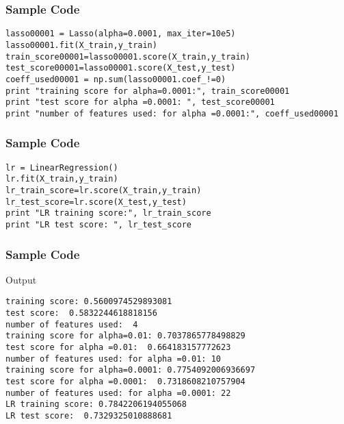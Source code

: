 \begin{frame}[fragile]\frametitle{Sample Code}

\begin{lstlisting}
lasso00001 = Lasso(alpha=0.0001, max_iter=10e5)
lasso00001.fit(X_train,y_train)
train_score00001=lasso00001.score(X_train,y_train)
test_score00001=lasso00001.score(X_test,y_test)
coeff_used00001 = np.sum(lasso00001.coef_!=0)
print "training score for alpha=0.0001:", train_score00001 
print "test score for alpha =0.0001: ", test_score00001
print "number of features used: for alpha =0.0001:", coeff_used00001
\end{lstlisting}

\end{frame}

\begin{frame}[fragile]\frametitle{Sample Code}

\begin{lstlisting}
lr = LinearRegression()
lr.fit(X_train,y_train)
lr_train_score=lr.score(X_train,y_train)
lr_test_score=lr.score(X_test,y_test)
print "LR training score:", lr_train_score 
print "LR test score: ", lr_test_score
\end{lstlisting}

\end{frame}


\begin{frame}[fragile]\frametitle{Sample Code}
Output

\begin{lstlisting}
training score: 0.5600974529893081
test score:  0.5832244618818156
number of features used:  4
training score for alpha=0.01: 0.7037865778498829
test score for alpha =0.01:  0.664183157772623
number of features used: for alpha =0.01: 10
training score for alpha=0.0001: 0.7754092006936697
test score for alpha =0.0001:  0.7318608210757904
number of features used: for alpha =0.0001: 22
LR training score: 0.7842206194055068
LR test score:  0.7329325010888681
\end{lstlisting}

\end{frame}

